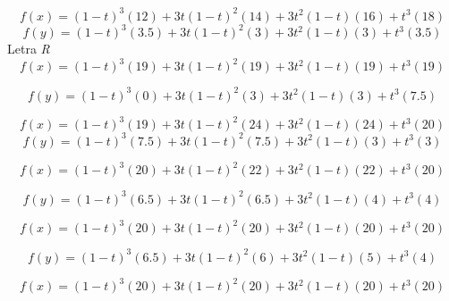 \documentclass[11pt]{article}
\begin{document}
\begin{enumerate}
\begin{equation}
f(x)=(1-t)^{3}\left(12\right)+3t(1-t)^{2}\left(14\right)+3t^{2}(1-t)\left(16\right)+t^{3}\left(18\right)
\end{equation}
\begin{equation}
f(y)=(1-t)^{3}\left(3.5\right)+3t(1-t)^{2}\left(3\right)+3t^{2}(1-t)\left(3\right)+t^{3}\left(3.5\right)
\end{equation}
Letra \emph{R}
\begin{equation}
	f(x) = (1-t)^{3}\left(19\right)+3t(1-t)^{2}\left(19\right)+3t^{2}(1-t)\left(19\right)+t^{3}\left(19\right)
\end{equation}

\begin{equation}
f(y) = (1-t)^{3}\left(0\right)+3t(1-t)^{2}\left(3\right)+3t^{2}(1-t)\left(3\right)+t^{3}\left(7.5\right)
\end{equation}

\begin{equation}
f(x) = (1-t)^{3}\left(19\right)+3t(1-t)^{2}\left(24\right)+3t^{2}(1-t)\left(24\right)+t^{3}\left(20\right) 
\end{equation}
\begin{equation}
f(y) = (1-t)^{3}\left(7.5\right)+3t(1-t)^{2}\left(7.5\right)+3t^{2}(1-t)\left(3\right)+t^{3}\left(3\right)
\end{equation}

\begin{equation}
f(x) = (1-t)^{3}\left(20\right)+3t(1-t)^{2}\left(22\right)+3t^{2}(1-t)\left(22\right)+t^{3}\left(20\right)
\end{equation}

\begin{equation}
f(y) = (1-t)^{3}\left(6.5\right)+3t(1-t)^{2}\left(6.5\right)+3t^{2}(1-t)\left(4\right)+t^{3}\left(4\right)
\end{equation}

\begin{equation}
f(x) = (1-t)^{3}\left(20\right)+3t(1-t)^{2}\left(20\right)+3t^{2}(1-t)\left(20\right)+t^{3}\left(20\right)
\end{equation}

\begin{equation}
f(y) = (1-t)^{3}\left(6.5\right)+3t(1-t)^{2}\left(6\right)+3t^{2}(1-t)\left(5\right)+t^{3}\left(4\right)
\end{equation}

\begin{equation}
f(x)=(1-t)^{3}\left(20\right)+3t(1-t)^{2}\left(20\right)+3t^{2}(1-t)\left(20\right)+t^{3}\left(20\right)
\end{equation}


\end{enumerate}
\end{document}
